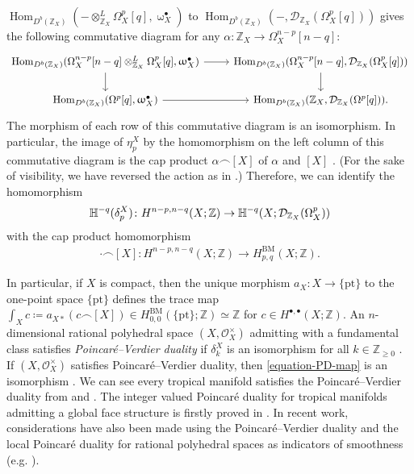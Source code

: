 \documentclass[a4paper,dvipdfmx,reqno,12pt]{amsart}
\theoremstyle{definition}
\newcommand{\deq}{\coloneqq}
\newcommand{\opn}[1]{\operatorname{#1}}
\numberwithin{equation}{section}
\begin{document}
\noindent
$\opn{Hom}_{D^{b}(\mathbb{Z}_X)}(- 
\otimes^{L}_{\mathbb{Z}_X} \Omega_X^{p}[q],
\upomega_X^{\bullet})$ to
$\opn{Hom}_{D^{b}(\mathbb{Z}_X)}(-,
\mathcal{D}_{\mathbb{Z}_X}(\Omega_X^{p}[q]))$
gives the following commutative diagram
for any 
$\alpha \colon \mathbb{Z}_X\to \Omega_X^{n-p}[n-q]$:
\[\begin{tikzcd}
{\opn{Hom}_{D^{b}(\mathbb{Z}_X)}(\Omega_X^{n-p}[n-q]
\otimes^{L}_{\mathbb{Z}_X} \Omega_X^{p}[q]
,\upomega_X^{\bullet})} & 
{\opn{Hom}_{D^{b}(\mathbb{Z}_X)}
(\Omega_X^{n-p}[n-q],\mathcal{D}_{\mathbb{Z}_X}(\Omega_X^{p}[q]))} \\
{\opn{Hom}_{D^{b}(\mathbb{Z}_X)}(\Omega^{p}[q],
\upomega_X^{\bullet})} & {\opn{Hom}_{D^{b}(\mathbb{Z}_X)}(\mathbb{Z}_X,\mathcal{D}_{\mathbb{Z}_X}(\Omega^{p}[q]))}.
	\arrow[from=1-2, to=2-2]
	\arrow[from=2-1, to=2-2]
	\arrow[from=1-1, to=1-2]
	\arrow[from=1-1, to=2-1]
\end{tikzcd}\]
The morphism of each row of
this commutative diagram is an isomorphism.
In particular,
the image of $\eta^X_{p}$ by the homomorphism
on the left column of this commutative diagram
is the cap product $\alpha\frown [X]$
of $\alpha$ and $[X]$ \cite[]{MR4637248}.
(For the sake of visibility, we have reversed 
the action as in \cite[]{MR4637248}.)
Therefore, we can identify
the homomorphism
\begin{align}
\mathbb{H}^{-q}(\delta_p^{X})
\colon H^{n-p,n-q}(X;\mathbb{Z})
\to \mathbb{H}^{-q}(X;\mathcal{D}_{\mathbb{Z}_X}
(\Omega_X^{p})) \notag
\end{align}
with the cap product homomorphism
\begin{align}
\label{equation-PD-map}
\cdot \frown [X]
\colon H^{n-p,n-q}(X;\mathbb{Z})
\to
H^{\mathrm{BM}}_{p,q}(X;\mathbb{Z}).
\end{align}

In particular, if $X$ is compact,
then the unique morphism 
$a_X\colon X\to \{\mathrm{pt}\}$
to the one-point space $\{\mathrm{pt}\}$
defines the trace map
$\int_X c\deq a_{X*}(c\frown [X])\in 
H_{0,0}^{\mathrm{BM}}(\{\mathrm{pt}\};\mathbb{Z})
\simeq \mathbb{Z}$ for
$c\in H^{\bullet,\bullet}(X;\mathbb{Z})$.
An $n$-dimensional rational polyhedral space
$(X,\mathcal{O}_X^{\times})$
admitting with a fundamental class satisfies
\emph{Poincar\'e--Verdier duality} if 
$\delta_{k}^{X}$ is an isomorphism for all
$k\in \mathbb{Z}_{\geq 0}$
\cite[Definition 6.4]{MR4637248}.
If $(X,\mathcal{O}_X^{\times})$ satisfies 
Poincar\'e--Verdier duality, then
\cref{equation-PD-map} is an isomorphism
\cite[Coroolary 6.9]{MR4637248}.
We can see every tropical manifold
satisfies the Poincar\'e--Verdier duality
from \cite[Proposition 5.5]{MR3894860} and
\cite[Theorem 6.7]{MR4637248}.
The integer valued Poincar\'e duality for tropical manifolds
admitting a global face structure is firstly proved in
\cite[Theorem 5.3]{MR3894860}.
In recent work,
considerations have also been made using
the Poincar\'e--Verdier duality
and the local Poincar\'e duality for rational polyhedral
spaces as indicators of smoothness
(e.g. \cite{MR4626316,amini2021homology,MR4637248}). 
\end{document}
